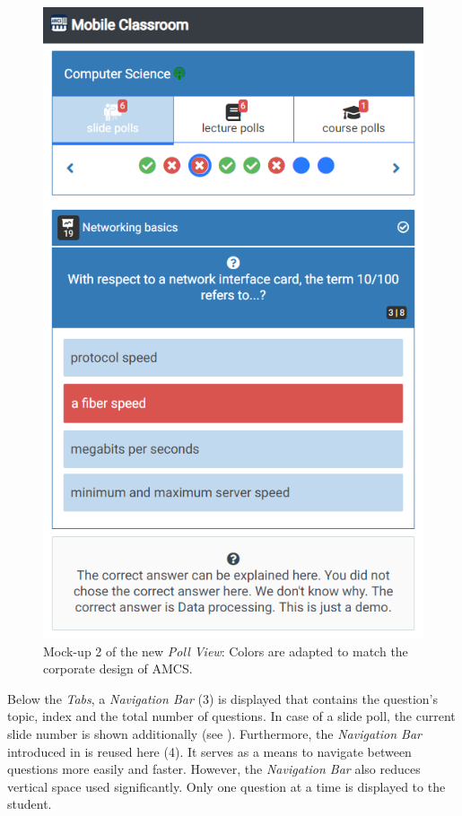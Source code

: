 \begin{figure}[ht]
	\begin{minipage}[t]{\textwidth}
		\centering
		\includegraphics[width=.7\textwidth]{mockups/poll_view_enhancement_v2.png}
		\captionsetup{width=.8\linewidth}
		\caption{Mock-up 2 of the new \emph{Poll View}:
			Colors are adapted to match the corporate design of AMCS.
		}
		\label{figure:pollviewenhanvement2}
	\end{minipage}
\end{figure}
Below the \emph{Tabs}, a \emph{Navigation Bar} (3) is displayed that contains the question's topic, index and the total number of questions. In case of a slide poll, the current slide number is shown additionally (see ).
Furthermore, the \emph{Navigation Bar} introduced in  is reused here (4). It serves as a means to navigate between questions more easily and faster. However, the \emph{Navigation Bar} also reduces vertical space used significantly. Only one question at a time is displayed to the student.
\newline
\newline
